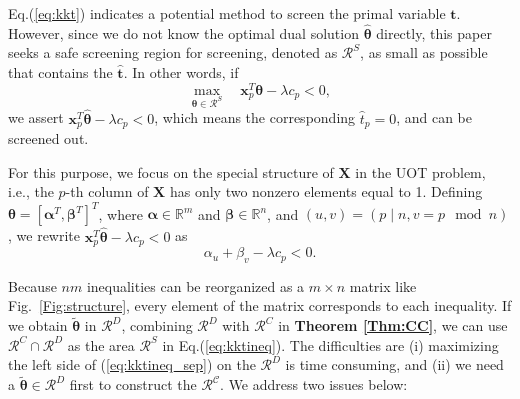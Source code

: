\documentclass[twoside]{article}
\theoremstyle{plain}
\newcommand{\R}{\mathbb{R}}
\newcommand{\mat}[1]{\mathbf{#1}}
\renewcommand{\vec}[1]{\bm{#1}}
\begin{document}
Eq.(\ref{eq:kkt}) indicates a potential method to screen the primal variable $\vec{t}$. However, since we do not know the optimal dual solution $\hat{\vec{\theta}}$ directly, this paper seeks a safe screening region for screening, denoted as $\mathcal{R}^{S}$, as small as possible that contains the $\hat{\vec{t}}$. In other words, if
\begin{equation}
\label{eq:kktineq}
\max_{\vec{\theta} \in \mathcal{R}^S}\quad  \vec{x}_p^T\vec{\theta} -\lambda c_p < 0,
\end{equation}
we assert 
$\vec{x}_p^T\hat{\vec{\theta}} -\lambda c_p < 0$,
which means the corresponding $\hat{{t}}_p = 0$, and can be screened out. 

For this purpose, we focus on the special structure of $\mat{X}$ in the UOT problem, i.e., the $p$-th column of $\mat{X}$ has only two nonzero elements equal to 1. Defining $\vec{\theta} = [{\vec{\alpha}}^T,{\vec{\beta}}^T]^T$, where $\vec{\alpha}\in\R^{m}$ and $\vec{\beta}\in\R^{n}$, and $(u,v)=(p \mid n,v= p \mod n)$, we rewrite $\vec{x}_p^T\hat{\vec{\theta}} -\lambda c_p < 0$ as
%
\begin{equation}
\label{eq:kktineq_sep}
\alpha_{u} + \beta_{v}-\lambda c_p < 0.
\end{equation}

Because $nm$ inequalities can be reorganized as a $m \times n$ matrix like Fig.~\ref{Fig:structure}, every element of the matrix corresponds to each inequality. If we obtain $\tilde{\vec{\theta}}$ in $\mathcal{R}^{D}$, combining $\mathcal{R}^{D}$ with $\mathcal{R}^{C}$ in {\bf Theorem \ref{Thm:CC}}, we can use $\mathcal{R}^{C}\cap\mathcal{R}^{D}$ as the area $\mathcal{R}^{S}$ in Eq.(\ref{eq:kktineq}). The  difficulties are (i) maximizing the left side of (\ref{eq:kktineq_sep}) on the $\mathcal{R}^{D}$ is time consuming, and (ii) we need a $\tilde{\vec{\theta}} \in \mathcal{R}^{D}$ first to construct the $\mathcal{R^{C}}$. We address two issues below:
\end{document}
